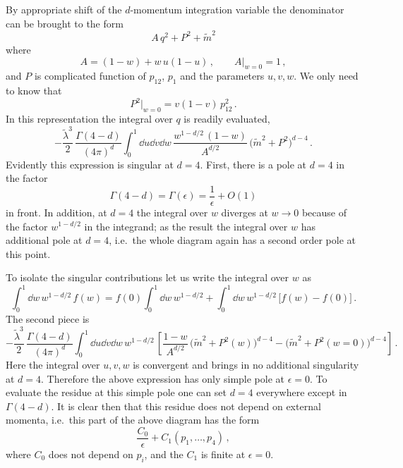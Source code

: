 By appropriate shift of the $d$-momentum integration variable the denominator
can be brought to the form
\[
A\,q^2+P^2+\tilde m^2
\]
where
\[
A=(1-w)+w\,u(1-u)\,,\qquad A\big|_{w=0}=1\,,
\]
and $P$ is complicated function of $p_{12}$, $p_1$ and the parameters $u,v,w$.
We only need to know that
\[
P^2\Big|_{w=0}=v(1-v)\,p_{12}^2\,.
\]
In this representation the integral over $q$ is readily evaluated,
\[
-\frac{\tilde\lambda^3}2\,\frac{\Gamma(4-d)}{(4\pi)^d}\int_0^1\dd u\dd v\dd w\,\frac{w^{1-d/2}\,(1-w)}{A^{d/2}}\,\bigl(\tilde m^2+P^2\bigr)^{d-4}\,.
\]
Evidently this expression is singular at $d=4$. First, there is a pole at $d=4$
in the factor
\[
\Gamma(4-d)=\Gamma(\epsilon)=\frac1\epsilon+O(1)
\]
in front. In addition, at $d=4$ the integral over $w$ diverges at $w\to0$
because of the factor $w^{1-d/2}$ in the integrand; as the result the
integral over $w$ has additional pole at $d=4$, i.e.\ the whole diagram again
has a second order pole at this point.

To isolate the singular contributions let us write the integral over $w$ as
\[
\int_0^1\dd w\,w^{1-d/2}\,f(w)=f(0)\int_0^1\dd w\,w^{1-d/2}+\int_0^1\dd w\,w^{1-d/2}\,\bigl[f(w)-f(0)\bigr]\,.
\]
The second piece is
\[
-\frac{\tilde\lambda^3}2\,\frac{\Gamma(4-d)}{(4\pi)^d}\int_0^1\dd u\dd v\dd w\,w^{1-d/2}\,
\left[\frac{1-w}{A^{d/2}}\,\bigl(\tilde m^2+P^2(w)\bigr)^{d-4}-\bigl(\tilde m^2+P^2(w=0)\bigr)^{d-4}\right]\,.
\]
Here the integral over $u,v,w$ is convergent and brings in no additional
singularity at $d=4$. Therefore the above expression has only simple pole at
$\epsilon=0$. To evaluate the residue at this simple pole one can set $d=4$
everywhere except in $\Gamma(4-d)$. It is clear then that this residue does not
depend on external momenta, i.e.\ this part of the above diagram has the form
\[
\frac{C_0}\epsilon+C_1(p_1,\dots,p_4)\,,
\]
where $C_0$ does not depend on $p_i$, and the $C_1$ is finite at $\epsilon=0$.

